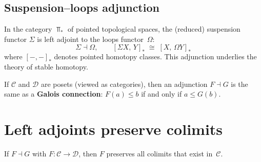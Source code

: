 \subsection{Suspension--loops adjunction}

\begin{example}\label{ex:suspension-loops}
In the category $\Top_*$ of pointed topological spaces, the
(reduced) suspension functor $\Sigma$ is left adjoint to the
loops functor~$\Omega$:
\[
    \Sigma \dashv \Omega, \qquad
    [\Sigma X,\, Y]_* \;\cong\; [X,\,\Omega Y]_*
\]
where $[-,-]_*$ denotes pointed homotopy classes.
This adjunction underlies the theory of stable homotopy.
\end{example}

\begin{example}\label{ex:galois-connection}
If $\mathcal{C}$ and $\mathcal{D}$ are posets (viewed as categories),
then an adjunction $F\dashv G$ is the same as a \textbf{Galois connection}:
$F(a)\leq b$ if and only if $a\leq G(b)$.
\end{example}


\section{Left adjoints preserve colimits}\label{sec:ladj-colim}

\begin{theorem}%
\label{thm:ladj-preserve-colim}
If $F\dashv G$ with $F\colon\mathcal{C}\to\mathcal{D}$,
then $F$ preserves all colimits that exist in~$\mathcal{C}$.
\end{theorem}

